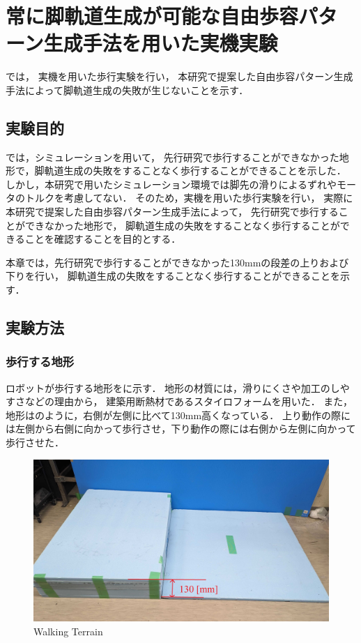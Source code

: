 ﻿
\chapter{常に脚軌道生成が可能な自由歩容パターン生成手法を用いた実機実験}\label{chapter:常に脚軌道生成が可能な自由歩容パターン生成手法を用いた実機実験}

では，
実機を用いた歩行実験を行い，
本研究で提案した自由歩容パターン生成手法によって脚軌道生成の失敗が生じないことを示す．

\section{実験目的}
では，シミュレーションを用いて，
先行研究で歩行することができなかった地形で，脚軌道生成の失敗をすることなく歩行することができることを示した．
しかし，本研究で用いたシミュレーション環境では脚先の滑りによるずれやモータのトルクを考慮してない．
そのため，実機を用いた歩行実験を行い，
実際に本研究で提案した自由歩容パターン生成手法によって，
先行研究で歩行することができなかった地形で，
脚軌道生成の失敗をすることなく歩行することができることを確認することを目的とする．

本章では，先行研究で歩行することができなかった130mmの段差の上りおよび下りを行い，
脚軌道生成の失敗をすることなく歩行することができることを示す．

\section{実験方法}
\subsection{歩行する地形}
ロボットが歩行する地形をに示す．
地形の材質には，滑りにくさや加工のしやすさなどの理由から，
建築用断熱材であるスタイロフォームを用いた．
また，地形はのように，右側が左側に比べて130mm高くなっている．
上り動作の際には左側から右側に向かって歩行させ，下り動作の際には右側から左側に向かって歩行させた．

\begin{figure}[tb]
  \centering
  \includegraphics[width=0.8\linewidth]{figure/chapter5/walking-terrain.jpg}
  \caption{Walking Terrain}
  \label{fig:walking-terrain}  %
\end{figure}

